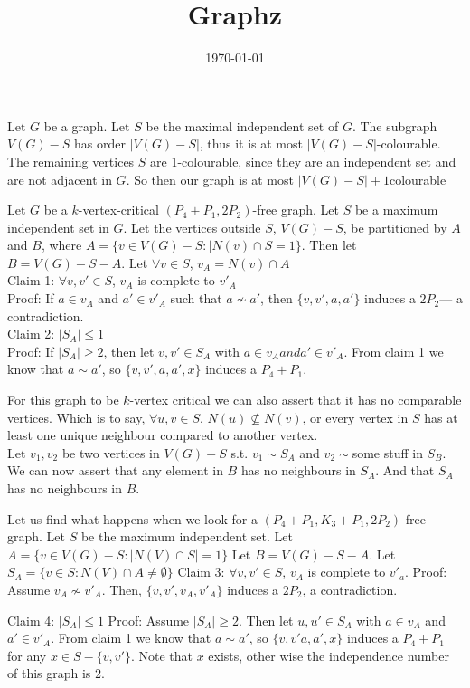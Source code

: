 \documentclass[12pt]{article}
\title{Graphz}
\date{\today}
\begin{document}
Let $G$ be a graph. Let $S$ be the maximal independent set of $G$. The subgraph $V(G) - S$ has order $|V(G) - S|$, thus it is at most $|V(G) - S|$-colourable. The remaining vertices $S$ are 1-colourable, since they are an independent set and are not adjacent in $G$. So then our graph is at most $|V(G) - S| + 1$colourable

Let $G$ be a $k$-vertex-critical $(P_4 + P_1, 2P_2)$-free graph. Let $S$ be a maximum independent set in $G$. Let the vertices outside $S$, $V(G) - S$, be partitioned by $A$ and $B$, where $A = \{v \in V(G) - S : |N(v) \cap S = 1\}$. Then let $B = V(G) - S - A$.
Let $\forall v \in S$, $v_A = N(v) \cap A$\\
Claim 1: $\forall v,v' \in S$, $v_A$ is complete to $v'_A$\\
Proof: If $a \in v_A$ and $a' \in v'_A$ such that $a \not \sim a'$, then $\{v, v', a, a'\}$ induces a $2P_2$--- a contradiction.\\
Claim 2: $|S_A| \leq 1$\\
Proof: If $|S_A| \geq 2$, then let $v, v' \in S_A$ with $a\in v_A and a' \in v'_A$. From claim 1 we know that $a \sim a'$, so $\{v, v', a, a', x\}$ induces a $P_4 + P_1$.

For this graph to be $k$-vertex critical we can also assert that it has no comparable vertices.
Which is to say, $\forall u, v \in S$, $N(u) \not \subseteq N(v)$, or every vertex in $S$ has at least one unique neighbour compared to another vertex.\\
Let $v_1, v_2$ be two vertices in $V(G) - S$ s.t. $v_1 \sim S_A$ and $v_2 \sim $some stuff in $S_B$.
We can now assert that any element in $B$ has no neighbours in $S_A$. And that $S_A$ has no neighbours in $B$.

Let us find what happens when we look for a $(P_4 + P_1, K_3 + P_1, 2P_2)$-free graph.
Let $S$ be the maximum independent set. Let $A = \{v \in V(G) - S : |N(V) \cap S| = 1\}$
Let $B = V(G) - S - A$.
Let $S_A = \{ v \in S : N(V) \cap A \not = \emptyset \}$
Claim 3: $\forall v, v' \in S$, $v_A$ is complete to $v'_a$.
Proof: Assume $v_A \not \sim v'_A$. Then, $\{ v, v', v_A, v'_A \}$ induces a $2P_2$, a contradiction.

Claim 4: $|S_A| \leq 1 $
Proof: Assume $|S_A| \geq 2$. Then let $u, u' \in S_A$ with $a \in v_A$ and $a' \in v'_A$. From claim 1 we know that $a \sim a'$, so $\{v, v' a, a', x\}$ induces a $P_4 + P_1$ for any $x \in S - \{v, v'\}$. Note that $x$ exists, other wise the independence number of this graph is 2.
\end{document}
